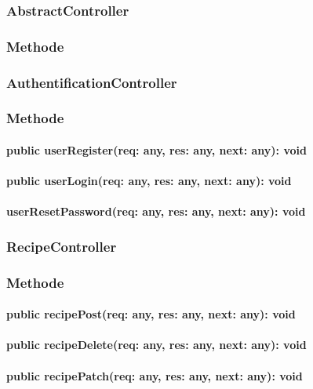 \documentclass[parskip=full]{scrartcl}
\begin{document}
\subsubsection{AbstractController}
\subsubsection*{Methode}


\subsubsection{AuthentificationController}
\subsubsection*{Methode}
\paragraph{public userRegister(req: any, res: any, next: any): void}
\paragraph{public userLogin(req: any, res: any, next: any): void}
\paragraph{userResetPassword(req: any, res: any, next: any): void}
\paragraph{}

\subsubsection{RecipeController}
\subsubsection*{Methode}
\paragraph{public recipePost(req: any, res: any, next: any): void}
\paragraph{public recipeDelete(req: any, res: any, next: any): void}
\paragraph{public recipePatch(req: any, res: any, next: any): void}
\end{document}
